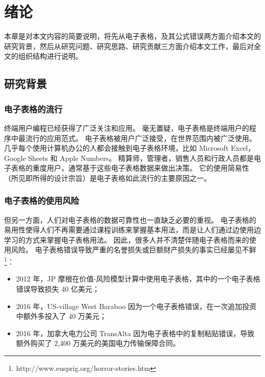 \chapter{绪论}\label{introduction}

本章是对本文内容的简要说明，将先从电子表格，及其公式错误两方面介绍本文的研究背景，然后从研究问题、研究思路、研究贡献三方面介绍本文工作，最后对全文的组织结构进行说明。

\section{研究背景}

\subsection{电子表格的流行}

终端用户编程已经获得了广泛关注和应用。
毫无置疑，电子表格是终端用户的程序中最流行的应用范式。
电子表格被用户广泛接受，在世界范围内被广泛使用。
几乎每个使用计算机办公的人都会接触到电子表格环境，比如 Microsoft Excel，Google Sheets 和 Apple Numbers。
精算师，管理者，销售人员和行政人员都是电子表格的重度用户\cite{scaffidi2005estimating}，通常基于这些电子表格数据来做出决策。
它的使用简易性（所见即所得的设计宗旨）是电子表格如此流行的主要原因之一。

\subsection{电子表格的使用风险}

但另一方面，人们对电子表格的数据可靠性也一直缺乏必要的重视。
电子表格的易用性使得人们不再需要通过课程训练来掌握基本用法，而是让人们通过边使用边学习的方式来掌握电子表格用法。
因此，很多人并不清楚伴随电子表格而来的使用风险。
电子表格错误导致严重的名誉损失或巨额财产损失的事实已经屡见不鲜\footnote{http://www.eusprig.org/horror-stories.htm}：

\begin{itemize}
    \item 2012 年，JP 摩根在价值-风险模型计算中使用电子表格，其中的一个电子表格错误导致损失 40 亿美元；
    \item 2016 年，US-village West Baraboo 因为一个电子表格错误，在一次追加投资中额外多投入了 40 万美元；
    \item 2016 年，加拿大电力公司 TransAlta 因为电子表格中的复制粘贴错误，导致额外购买了 2,400 万美元的美国电力传输保障合同。
\end{itemize}

